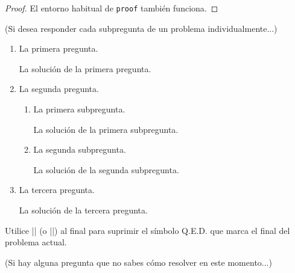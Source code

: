 \documentclass[11pt,
  logo = {example-image},
  title in boldface,
  theorem in new line,
]{homework}
\begin{document}
\begin{proof}
    El entorno habitual de \verb|proof| también funciona.
\end{proof}


\bigskip\textcolor{gray!55}{(Si desea responder cada subpregunta de un problema individualmente...)}

\begin{problem}
    \begin{enumerate}[itemsep=.5\baselineskip]
        \item La primera pregunta.

        \begin{solution}
            La solución de la primera pregunta.
        \end{solution}

        \item La segunda pregunta.

        \begin{enumerate}[itemsep=.3\baselineskip]
            \item La primera subpregunta.

            \begin{solution}
                La solución de la primera subpregunta.
            \end{solution}

            \item La segunda subpregunta.

            \begin{solution}
                La solución de la segunda subpregunta.
            \end{solution}

        \end{enumerate}

        \item La tercera pregunta.

        \begin{solution}
            La solución de la tercera pregunta.
        \end{solution}

    \end{enumerate}
    Utilice \cverb|\noqed| (o \cverb|\noQED|) al final para suprimir el símbolo Q.E.D. que marca el final del problema actual.
    \noQED
\end{problem}


\bigskip\textcolor{gray!55}{(Si hay alguna pregunta que no sabes cómo resolver en este momento...)}

\end{document}
